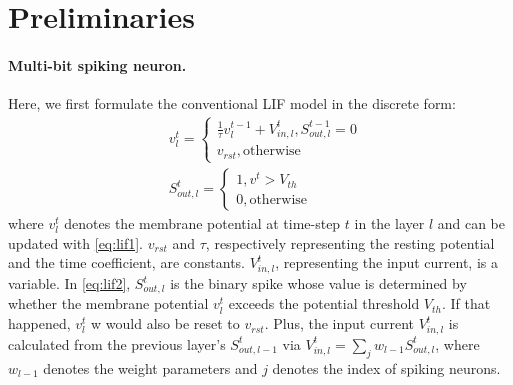 \section{Preliminaries}
\label{sec:preliminaries}

\paragraph{Multi-bit spiking neuron.}
Here, we first formulate the conventional LIF model in the discrete form:
\begin{align}
    &v^t_l=
    \begin{cases}\frac{1}{\tau}v^{t-1}_l+ V^t_{in,l}, S^{t-1}_{out,l}=0\\v_{rst},\text{otherwise}
    \end{cases}\label{eq:lif1}\\
&S^t_{out,l}=\begin{cases}1, v^t> V_{th} \\0, \text{otherwise}
\end{cases}\label{eq:lif2}
\end{align}
where $v^t_l$ denotes the membrane potential at time-step $t$ in the layer $l$ and can be updated with  \cref{eq:lif1}. $v_{rst}$ and $\tau$, respectively representing the resting potential and the time coefficient, are  constants. $V_{in,l}^t$, representing the input current, is a variable. In  \cref{eq:lif2}, $S^t_{out,l}$ is the binary spike whose value is determined by whether the membrane potential $v^t_l$ exceeds the potential threshold $V_{th}$. If that happened, $v^t_l$ w would also be reset to $v_{rst}$.
Plus, the input current $V_{in,l}^t$ is calculated from  the previous layer's $S^t_{out,l-1}$ via $V_{in,l}^t=\sum_jw_{l-1}S_{out,l}^t$, where $w_{l-1}$ denotes the weight parameters and $j$ denotes
the index of  spiking neurons.


